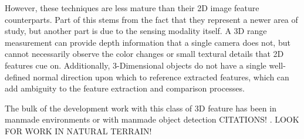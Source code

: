 However, these techniques are less mature than their 2D image feature counterparts. Part of this stems from the fact that they represent a newer area of study, but another part is due to the sensing modality itself. A 3D range measurement  can provide depth information that a single camera does not, but cannot necessarily observe the color changes or small textural details that 2D features cue on. Additionally, 3-Dimensional objects do not have a single well-defined normal direction upon which to reference extracted features, which can add ambiguity to the feature extraction and comparison processes. 

The bulk of the development work with this class of 3D feature has been in manmade environments or with manmade object detection \cite{??} CITATIONS! . LOOK FOR WORK IN NATURAL TERRAIN!


%
%
%
%
%

